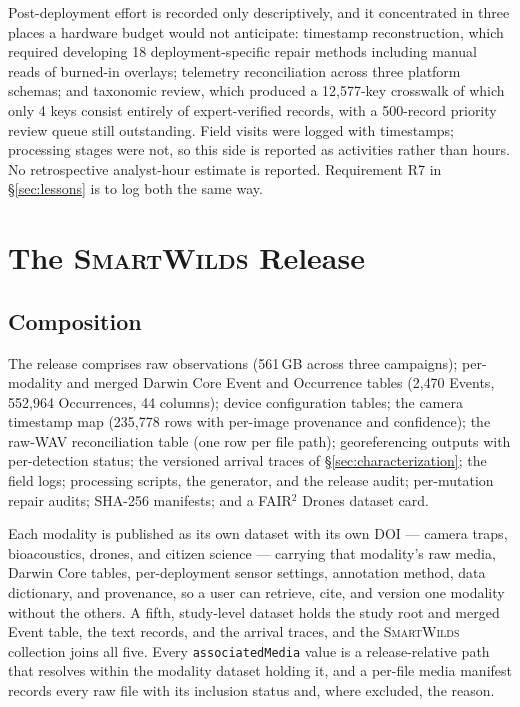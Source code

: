 \documentclass[sigconf]{acmart}
\newcommand{\smartwilds}{\textsc{SmartWilds}\xspace}
\begin{document}
Post-deployment effort is recorded only descriptively, and it
concentrated in three places a hardware budget would not anticipate:
timestamp reconstruction, which required developing 18
deployment-specific repair methods including manual reads of burned-in
overlays; telemetry reconciliation across three platform schemas; and
taxonomic review, which produced a 12{,}577-key crosswalk of which only
4 keys consist entirely of expert-verified records, with a 500-record
priority review queue still outstanding. Field visits were logged with
timestamps; processing stages were not, so this side is reported as
activities rather than hours. No retrospective analyst-hour estimate is
reported. Requirement R7 in \S\ref{sec:lessons} is to log both the same way.

\section{The \smartwilds Release}
\label{sec:release}

\subsection{Composition}

The release comprises raw observations (561\,GB across three
campaigns); per-modality and merged Darwin Core Event and Occurrence
tables (2{,}470 Events, 552{,}964 Occurrences, 44 columns); device
configuration tables; the camera timestamp map (235{,}778 rows with
per-image provenance and confidence); the raw-WAV reconciliation table
(one row per file path); georeferencing outputs with per-detection
status; the versioned arrival traces of \S\ref{sec:characterization};
the field logs; processing scripts, the generator, and the release
audit; per-mutation repair audits; SHA-256 manifests; and a
FAIR$^2$ Drones dataset card.

Each modality is published as its own dataset with its own DOI ---
camera traps, bioacoustics, drones, and citizen science --- carrying
that modality's raw media, Darwin Core tables, per-deployment sensor
settings, annotation method, data dictionary, and provenance, so a user
can retrieve, cite, and version one modality without the others. A
fifth, study-level dataset holds the study root and merged Event table,
the text records, and the arrival traces, and the \smartwilds
collection joins all five. Every \texttt{associatedMedia} value is a
release-relative path that resolves within the modality dataset holding
it, and a per-file media manifest records every raw file with its
inclusion status and, where excluded, the reason.
\end{document}
